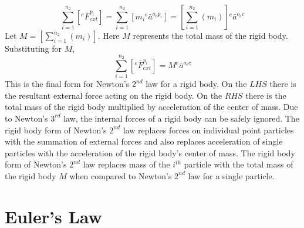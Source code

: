 \documentclass[class=report, 12pt, crop=false]{standalone}
\begin{document}
\begin{center}
$$\sum^{n_{2}}_{i = 1}\left[{}^{e}\bar{F}^{p_{i}}_{ext}\right] = \sum^{n_{2}}_{i = 1}\left[m_{i}{}^{e}\bar{a}^{o_{e}p_{i}}\right] = \left[\sum^{n_{2}}_{i = 1}\left(m_{i}\right)\right]{}^{e}\bar{a}^{o_{e}c}$$
Let $\displaystyle M = \left[\sum^{n_{2}}_{i = 1}\left(m_{i}\right)\right]$. Here $M$ represents the total mass of the rigid body. Substituting for $M$,
$$\sum^{n_{2}}_{i = 1}\left[{}^{e}\bar{F}^{p_{i}}_{ext}\right] = M{}^{e}\bar{a}^{o_{e}c}$$
This is the final form for Newton's $2^{nd}$ law for a rigid body. On the $LHS$ there is the resultant external force acting on the rigid body. On the $RHS$ there is the total mass of the rigid body multiplied by acceleration of the center of mass. Due to Newton's $3^{rd}$ law, the internal forces of a rigid body can be safely ignored. The rigid body form of Newton's $2^{nd}$ law replaces forces on individual point particles with the summation of external forces and also replaces acceleration of single particles with the acceleration of the rigid body's center of mass. The rigid body form of Newton's $2^{nd}$ law replaces mass of the $i^{th}$ particle with the total mass of the rigid body $M$ when compared to Newton's $2^{nd}$ law for a single particle.

\section{Euler's Law}
\begin{comment}
\end{comment}

\end{center}
\end{document}
